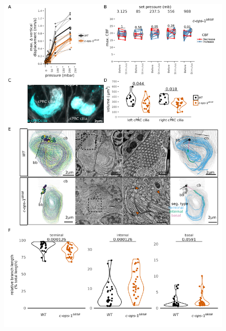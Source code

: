 \documentclass[
  11pt,
]{article}
\begin{document}
\begin{figure}[H]

{\centering \includegraphics[width=1\textwidth,height=\textheight]{Figures/Figure3.png}

}


\end{figure}
\end{document}
